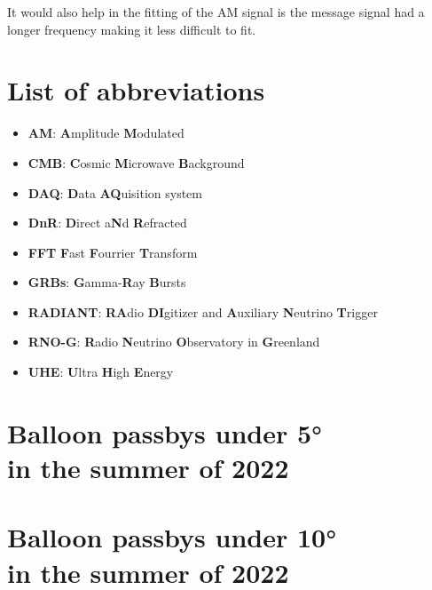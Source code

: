 \documentclass[11pt,a4paper,faculty=we,language=en,doctype=report]{cls/ugent-doc}
\begin{document}
It would also help in the fitting of the AM signal is the message signal had a longer frequency
making it less difficult to fit.

\appendix
\chapter{List of abbreviations}
\begin{itemize}
\item \textbf{AM}: \textbf{A}mplitude \textbf{M}odulated
\item \textbf{CMB}: \textbf{C}osmic \textbf{M}icrowave \textbf{B}ackground
\item \textbf{DAQ}: \textbf{D}ata \textbf{AQ}uisition system
\item \textbf{DnR}: \textbf{D}irect a\textbf{N}d \textbf{R}efracted
\item \textbf{FFT} \textbf{F}ast \textbf{F}ourrier \textbf{T}ransform
\item \textbf{GRBs}: \textbf{G}amma-\textbf{R}ay \textbf{B}ursts
\item \textbf{RADIANT}: \textbf{RA}dio \textbf{DI}gitizer and \textbf{A}uxiliary \textbf{N}eutrino \textbf{T}rigger
\item \textbf{RNO-G}: \textbf{R}adio \textbf{N}eutrino \textbf{O}bservatory in \textbf{G}reenland
\item \textbf{UHE}: \textbf{U}ltra \textbf{H}igh \textbf{E}nergy 
\end{itemize}
\chapter{Balloon passbys under 5°\\ in the summer of 2022}
\label{app:5Deg}
\chapter{Balloon passbys under 10°\\ in the summer of 2022}
\label{app:10Deg}
\begin{table}[h!]
\end{table}
\begin{table}
\end{table}
\begin{table}
\end{table}
\begin{table}
\end{table}
\begin{table}
\end{table}
\end{document}
